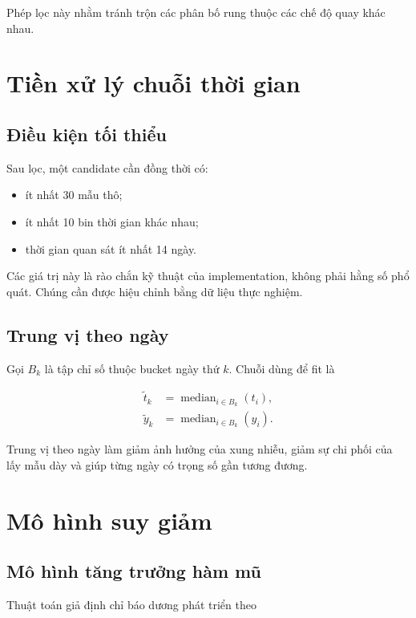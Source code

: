 \documentclass[12pt,a4paper]{article}
\begin{document}
Phép lọc này nhằm tránh trộn các phân bố rung thuộc các chế độ quay khác nhau.

\section{Tiền xử lý chuỗi thời gian}

\subsection{Điều kiện tối thiểu}

Sau lọc, một candidate cần đồng thời có:

\begin{itemize}
  \item ít nhất 30 mẫu thô;
  \item ít nhất 10 bin thời gian khác nhau;
  \item thời gian quan sát ít nhất 14 ngày.
\end{itemize}

Các giá trị này là rào chắn kỹ thuật của implementation, không phải hằng số phổ quát. Chúng cần được hiệu chỉnh bằng dữ liệu thực nghiệm.

\subsection{Trung vị theo ngày}

Gọi $B_k$ là tập chỉ số thuộc bucket ngày thứ $k$. Chuỗi dùng để fit là

\begin{align}
  \widetilde{t}_k &= \operatorname{median}_{i\in B_k}(t_i),\\
  \widetilde{y}_k &= \operatorname{median}_{i\in B_k}(y_i).
  \label{eq:daily-median}
\end{align}

Trung vị theo ngày làm giảm ảnh hưởng của xung nhiễu, giảm sự chi phối của lấy mẫu dày và giúp từng ngày có trọng số gần tương đương.

\section{Mô hình suy giảm}

\subsection{Mô hình tăng trưởng hàm mũ}

Thuật toán giả định chỉ báo dương phát triển theo
\end{document}
